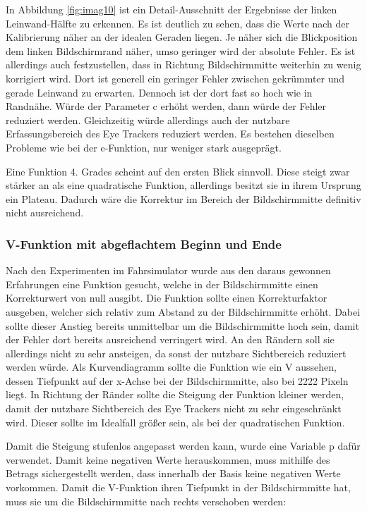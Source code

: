 In Abbildung \ref{fig:imag10} ist ein Detail-Ausschnitt der Ergebnisse der linken Leinwand-Hälfte zu erkennen. Es ist deutlich zu sehen, dass die Werte nach der Kalibrierung näher an der idealen Geraden liegen. Je näher sich die Blickposition dem linken Bildschirmrand näher, umso geringer wird der absolute Fehler. Es ist allerdings auch festzustellen, dass in Richtung Bildschirmmitte weiterhin zu wenig korrigiert wird. Dort ist generell ein geringer Fehler zwischen gekrümmter und gerade Leinwand zu erwarten. Dennoch ist der dort fast so hoch wie in Randnähe. Würde der Parameter c erhöht werden, dann würde der Fehler reduziert werden. Gleichzeitig würde allerdings auch der nutzbare Erfassungsbereich des Eye Trackers reduziert werden. Es bestehen dieselben Probleme wie bei der e-Funktion, nur weniger stark ausgeprägt. 

Eine Funktion 4. Grades scheint auf den ersten Blick sinnvoll. Diese steigt zwar stärker an als eine quadratische Funktion, allerdings besitzt sie in ihrem Ursprung ein Plateau. Dadurch wäre die Korrektur im Bereich der Bildschirmmitte definitiv nicht ausreichend. 


\subsubsection{V-Funktion mit abgeflachtem Beginn und Ende}

Nach den Experimenten im Fahrsimulator wurde aus den daraus gewonnen Erfahrungen eine Funktion gesucht, welche in der Bildschirmmitte einen Korrekturwert von null ausgibt. Die Funktion sollte einen Korrekturfaktor ausgeben, welcher sich relativ zum Abstand zu der Bildschirmmitte erhöht. Dabei sollte dieser Anstieg bereits unmittelbar um die Bildschirmmitte hoch sein, damit der Fehler dort bereits ausreichend verringert wird. An den Rändern soll sie allerdings nicht zu sehr ansteigen, da sonst der nutzbare Sichtbereich reduziert werden würde. Als Kurvendiagramm sollte die Funktion wie ein V aussehen, dessen Tiefpunkt auf der x-Achse bei der Bildschirmmitte, also bei 2222 Pixeln liegt. In Richtung der Ränder sollte die Steigung der Funktion kleiner werden, damit der nutzbare Sichtbereich des Eye Trackers nicht zu sehr eingeschränkt wird. Dieser sollte im Idealfall größer sein, als bei der quadratischen Funktion. 

Damit die Steigung stufenlos angepasst werden kann, wurde eine Variable p dafür verwendet. Damit keine negativen Werte herauskommen, muss mithilfe des Betrags sichergestellt werden, dass innerhalb der Basis keine negativen Werte vorkommen. Damit die V-Funktion ihren Tiefpunkt in der Bildschirmmitte hat, muss sie um die Bildschirmmitte nach rechts verschoben werden:

